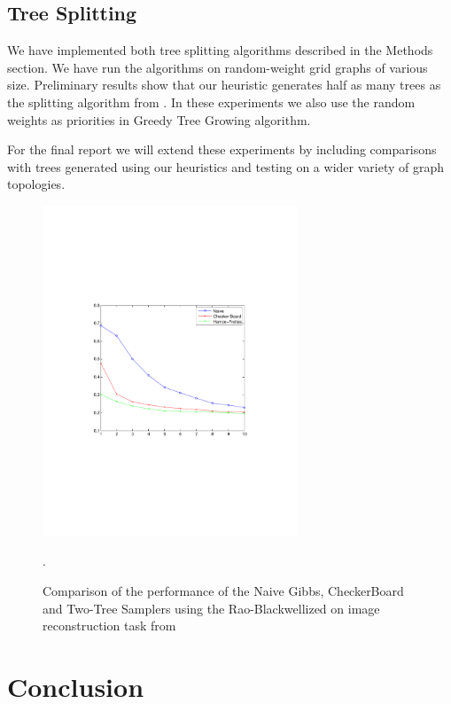 \documentclass{article} %
\begin{document}
\subsection{Tree Splitting}%

We have implemented both tree splitting algorithms described in the Methods section. 
We have run the algorithms on random-weight grid graphs of various size. 
Preliminary results show that our heuristic generates half as many trees as the splitting algorithm from \cite{rivasseau2005jungle}.
In these experiments we also use the random weights as priorities in Greedy Tree Growing algorithm.

For the final report we will extend these experiments by including comparisons
with trees generated using our heuristics and testing on a wider variety of
graph topologies. 

\begin{figure}
\begin{center}
\includegraphics[width=3in]{figures/image_reconstruction}
\caption[]{Comparison of the performance of the Naive Gibbs, CheckerBoard and
Two-Tree Samplers using the Rao-Blackwellized on image reconstruction task from \cite{hamze2004fields}}.
\label{fig:imageRecon}
\end{center}
\end{figure}

\section{Conclusion}

 
     
\end{document}
